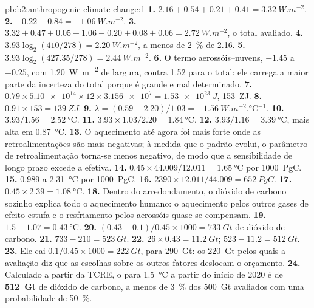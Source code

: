 \begin{solution}{pb:b2:anthropogenic-climate-change:1}
\textbf{1.} $2.16 + 0.54 + 0.21 + 0.41 = \qty{3.32}{W.m^{-2}}$.
\textbf{2.} $-0.22 - 0.84 = \qty{-1.06}{W.m^{-2}}$.
\textbf{3.} $3.32 + 0.47 + 0.05 - 1.06 - 0.20 + 0.08 + 0.06 = \qty{2.72}{W.m^{-2}}$, o total
avaliado.
\textbf{4.} $3.93\log_2(410/278) = \qty{2.20}{W.m^{-2}}$, a menos de \qty{2}{\percent} de 2.16.
\textbf{5.} $3.93\log_2(427.35/278) = \qty{2.44}{W.m^{-2}}$.
\textbf{6.} O termo aerossóis--nuvens, $-1.45$ a $-0.25$, com \qty{1.20}{W.m^{-2}} de largura, contra 1.52 para
o total: ele carrega a maior parte da incerteza do total porque é grande e mal
determinado.
\textbf{7.} $0.79 \times \num{5.10e14} \times 12 \times \num{3.156e7} = \qty{1.53e23}{J}$,
\qty{153}{ZJ}.
\textbf{8.} $0.91 \times 153 = \qty{139}{ZJ}$.
\textbf{9.} $\lambda = (0.59 - 2.20)/1.03 = \qty{-1.56}{W.m^{-2}.\celsius^{-1}}$.
\textbf{10.} $3.93/1.56 = \qty{2.52}{\celsius}$.
\textbf{11.} $3.93 \times 1.03/2.20 = \qty{1.84}{\celsius}$.
\textbf{12.} $3.93/1.16 = \qty{3.39}{\celsius}$, mais alta em \qty{0.87}{\celsius}.
\textbf{13.} O aquecimento até agora foi mais forte onde as retroalimentações são mais negativas; à medida que o
padrão evolui, o parâmetro de retroalimentação torna-se menos negativo, de modo que a sensibilidade de longo prazo
excede a efetiva.
\textbf{14.} $0.45 \times 44.009/12.011 = \qty{1.65}{\celsius}$ por \qty{1000}{PgC}.
\textbf{15.} 0.989 a \qty{2.31}{\celsius} por \qty{1000}{PgC}.
\textbf{16.} $2390 \times 12.011/44.009 = \qty{652}{PgC}$.
\textbf{17.} $0.45 \times 2.39 = \qty{1.08}{\celsius}$.
\textbf{18.} Dentro do arredondamento, o dióxido de carbono sozinho explica todo o aquecimento humano: o
aquecimento pelos outros gases de efeito estufa e o resfriamento pelos aerossóis quase se compensam.
\textbf{19.} $1.5 - 1.07 = \qty{0.43}{\celsius}$.
\textbf{20.} $(0.43 - 0.1)/0.45 \times 1000 = \qty{733}{Gt}$ de dióxido de carbono.
\textbf{21.} $733 - 210 = \qty{523}{Gt}$.
\textbf{22.} $26 \times 0.43 = \qty{11.2}{Gt}$; $523 - 11.2 = \qty{512}{Gt}$.
\textbf{23.} Ele cai $0.1/0.45 \times 1000 = \qty{222}{Gt}$, para \qty{290}{Gt}: os
\qty{220}{Gt} pelos quais a avaliação diz que as escolhas sobre os outros fatores deslocam o orçamento.
\textbf{24.} Calculado a partir da TCRE, o  para \qty{1.5}{\celsius} a partir do
início de 2020 é de \textbf{\qty[text-series-to-math=true]{512}{Gt}} de dióxido de carbono, a menos de
\qty{3}{\percent} dos \qty{500}{Gt} avaliados com uma probabilidade de \qty{50}{\percent}.
\end{solution}
